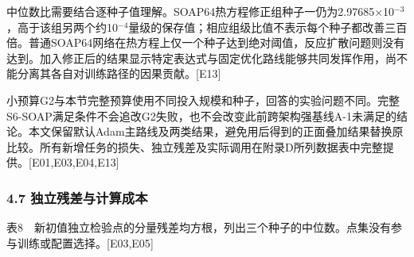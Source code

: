 \documentclass[11pt,a4paper]{article}
\begin{document}
中位数比需要结合逐种子值理解。SOAP64热方程修正组种子一仍为2.97685×10\ensuremath{^{-3}}，高于该组另两个约10\ensuremath{^{-4}}量级的保存值；相应组级比值不表示每个种子都改善三百倍。普通SOAP64网络在热方程上仅一个种子达到绝对阈值，反应扩散问题则没有达到。加入修正后的结果显示特定表达式与固定优化路线能够共同发挥作用，尚不能分离其各自对训练路径的因果贡献。{[}E13{]}

小预算G2与本节完整预算使用不同投入规模和种子，回答的实验问题不同。完整S6-SOAP满足条件不会追改G2失败，也不会改变此前跨架构强基线A-1未满足的结论。本文保留默认Adam主路线及两类结果，避免用后得到的正面叠加结果替换原比较。所有新增任务的损失、独立残差及实际调用在附录D所列数据表中完整提供。{[}E01,E03,E04,E13{]}

\subsubsection{4.7 独立残差与计算成本}\label{ux72ecux7acbux6b8bux5deeux4e0eux8ba1ux7b97ux6210ux672c}

表8　新初值独立检验点的分量残差均方根，列出三个种子的中位数。点集没有参与训练或配置选择。{[}E03,E05{]}
\end{document}
